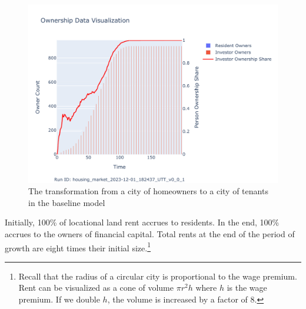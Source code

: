 \begin{figure}
    \centering
    \hspace{4cm} %
    \includegraphics[scale=0.8, trim={0 1cm 0 1.8cm}, clip]{fig/Analysis/Ownership_Data_1.pdf}
    \caption{The transformation from a city of homeowners to a city of tenants in the baseline model}
    \label{fig:Baseline_ownership_trajectory}
\end{figure}








Initially, 100\% of locational land rent accrues to residents. In the end, 100\% accrues to the owners of financial capital. Total rents at the end of the period of growth are eight times their initial size.\footnote{Recall that the radius of a circular city is proportional to the wage premium. Rent can be visualized as a cone of volume $\pi r^2 h$ where $h$ is the wage premium. If we double $h$, the volume is increased by a factor of 8.}

